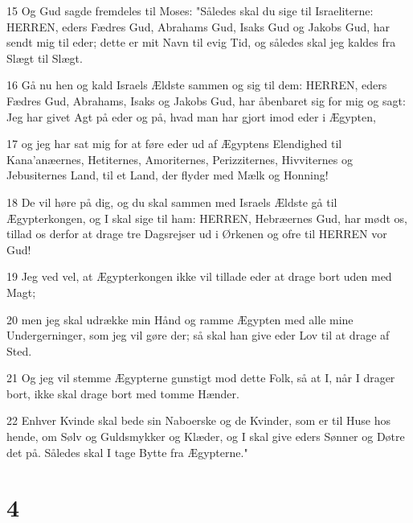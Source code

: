 \par 15 Og Gud sagde fremdeles til Moses: "Således skal du sige til Israeliterne: HERREN, eders Fædres Gud, Abrahams Gud, Isaks Gud og Jakobs Gud, har sendt mig til eder; dette er mit Navn til evig Tid, og således skal jeg kaldes fra Slægt til Slægt.
\par 16 Gå nu hen og kald Israels Ældste sammen og sig til dem: HERREN, eders Fædres Gud, Abrahams, Isaks og Jakobs Gud, har åbenbaret sig for mig og sagt: Jeg har givet Agt på eder og på, hvad man har gjort imod eder i Ægypten,
\par 17 og jeg har sat mig for at føre eder ud af Ægyptens Elendighed til Kana'anæernes, Hetiternes, Amoriternes, Perizziternes, Hivviternes og Jebusiternes Land, til et Land, der flyder med Mælk og Honning!
\par 18 De vil høre på dig, og du skal sammen med Israels Ældste gå til Ægypterkongen, og I skal sige til ham: HERREN, Hebræernes Gud, har mødt os, tillad os derfor at drage tre Dagsrejser ud i Ørkenen og ofre til HERREN vor Gud!
\par 19 Jeg ved vel, at Ægypterkongen ikke vil tillade eder at drage bort uden med Magt;
\par 20 men jeg skal udrække min Hånd og ramme Ægypten med alle mine Undergerninger, som jeg vil gøre der; så skal han give eder Lov til at drage af Sted.
\par 21 Og jeg vil stemme Ægypterne gunstigt mod dette Folk, så at I, når I drager bort, ikke skal drage bort med tomme Hænder.
\par 22 Enhver Kvinde skal bede sin Naboerske og de Kvinder, som er til Huse hos hende, om Sølv og Guldsmykker og Klæder, og I skal give eders Sønner og Døtre det på. Således skal I tage Bytte fra Ægypterne."

\chapter{4}

